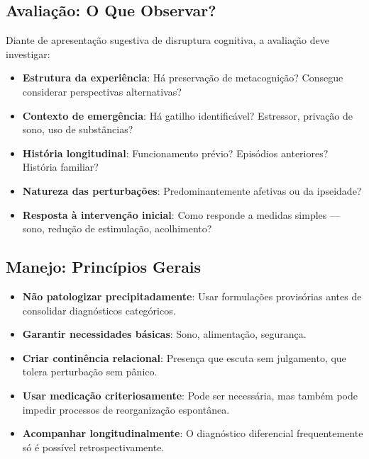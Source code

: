 \subsection{Avaliação: O Que Observar?}

Diante de apresentação sugestiva de disruptura cognitiva, a avaliação deve investigar:

\begin{itemize}
\item \textbf{Estrutura da experiência}: Há preservação de metacognição? Consegue considerar perspectivas alternativas?

\item \textbf{Contexto de emergência}: Há gatilho identificável? Estressor, privação de sono, uso de substâncias?

\item \textbf{História longitudinal}: Funcionamento prévio? Episódios anteriores? História familiar?

\item \textbf{Natureza das perturbações}: Predominantemente afetivas ou da ipseidade?

\item \textbf{Resposta à intervenção inicial}: Como responde a medidas simples --- sono, redução de estimulação, acolhimento?
\end{itemize}

\subsection{Manejo: Princípios Gerais}

\begin{itemize}
\item \textbf{Não patologizar precipitadamente}: Usar formulações provisórias antes de consolidar diagnósticos categóricos.

\item \textbf{Garantir necessidades básicas}: Sono, alimentação, segurança.

\item \textbf{Criar continência relacional}: Presença que escuta sem julgamento, que tolera perturbação sem pânico.

\item \textbf{Usar medicação criteriosamente}: Pode ser necessária, mas também pode impedir processos de reorganização espontânea.

\item \textbf{Acompanhar longitudinalmente}: O diagnóstico diferencial frequentemente só é possível retrospectivamente.
\end{itemize}

